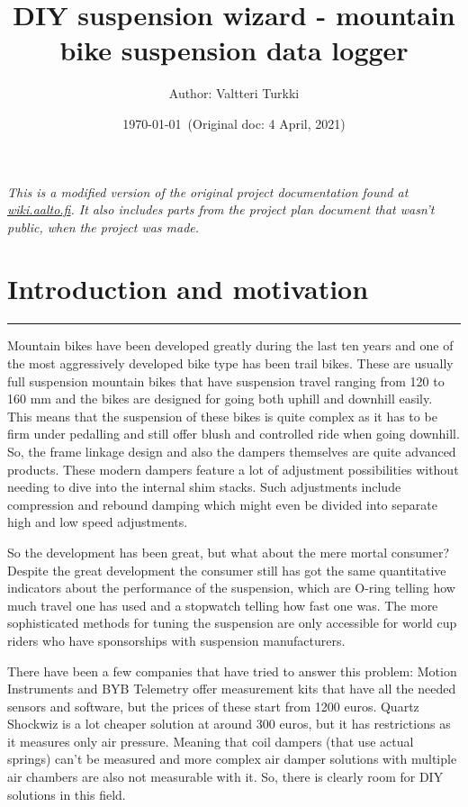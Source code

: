 \documentclass[a4paper,11pt]{article} %
\title{DIY suspension wizard - mountain bike suspension data logger}
\author{Author: Valtteri Turkki}
\date{ \today\ (Original doc: 4 April, 2021) }
\begin{document}

\maketitle

\textit{This is a modified version of the original project documentation found at \href{https://wiki.aalto.fi/display/MEX/DIY+suspension+wizard+-+mountain+bike+suspension+data+logger?searchId=LL4XGUSZ1}{wiki.aalto.fi}. It also includes parts from the project plan document that wasn't public, when the project was made.}\\

\vspace{2cm}

\tableofcontents

\newpage
\section{Introduction and motivation}
\rule{12.7cm}{0.4pt}

Mountain bikes have been developed greatly during the last ten years and one of the most aggressively developed bike type has been trail bikes. These are usually full suspension mountain bikes that have suspension travel ranging from 120 to 160 mm and the bikes are designed for going both uphill and downhill easily. This means that the suspension of these bikes is quite complex as it has to be firm under pedalling and still offer blush and controlled ride when going downhill. So, the frame linkage design and also the dampers themselves are quite advanced products. These modern dampers feature a lot of adjustment possibilities without needing to dive into the internal shim stacks. Such adjustments include compression and rebound damping which might even be divided into separate high and low speed adjustments.

So the development has been great, but what about the mere mortal consumer? Despite the great development the consumer still has got the same quantitative indicators about the performance of the suspension, which are O-ring telling how much travel one has used and a stopwatch telling how fast one was. The more sophisticated methods for tuning the suspension are only accessible for world cup riders who have sponsorships with suspension manufacturers.

There have been a few companies that have tried to answer this problem: Motion Instruments and BYB Telemetry offer measurement kits that have all the needed sensors and software, but the prices of these start from 1200 euros. Quartz Shockwiz is a lot cheaper solution at around 300 euros, but it has restrictions as it measures only air pressure. Meaning that coil dampers (that use actual springs) can't be measured and more complex air damper solutions with multiple air chambers are also not measurable with it. So, there is clearly room for DIY solutions in this field.
\end{document}
